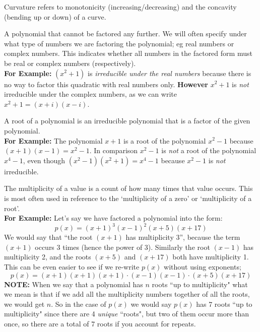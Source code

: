 \documentclass{ximera}
\begin{document}
\begin{definition}[Curvature]
    Curvature refers to monotonicity (increasing/decreasing) and the concavity (bending up or down) of a curve.
\end{definition} 

\begin{definition}
    A polynomial that cannot be factored any further. We will often specify under what type of numbers we are factoring the polynomial; eg real numbers or complex numbers. This indicates whether all numbers in the factored form must be real or complex numbers (respectively).\\
    \textbf{For Example:} $(x^2+1)$ is \textit{irreducible under the real numbers} because there is no way to factor this quadratic with real numbers only. \textbf{However} $x^2+1$ is \textit{not} irreducible under the complex numbers, as we can write $x^2+1 = (x+i)(x-i)$.
\end{definition} 

\begin{definition}
    A root of a polynomial is an irreducible polynomial that is a factor of the given polynomial.\\
    \textbf{For Example:} The polynomial $x + 1$ is a root of the polynomial $x^2 - 1$ because $(x+1)(x-1) = x^2 -1$. In comparison $x^2-1$ is \textit{not} a root of the polynomial $x^4-1$, even though $(x^2-1)(x^2+1) = x^4-1$ because $x^2-1$ is \textit{not} irreducible.
\end{definition}

\begin{definition}
    The multiplicity of a value is a count of how many times that value occurs. This is most often used in reference to the `multiplicity of a zero' or `multiplicity of a root'. \\
    \textbf{For Example:} Let's say we have factored a polynomial into the form:
    \[
        p(x) = (x+1)^3(x-1)^2(x+5)(x+17)
    \]
    We would say that ``the root $(x+1)$ has multiplicity 3'', because the term $(x+1)$ occurs 3 times (hence the power of 3). Similarly the root $(x-1)$ has multiplicity 2, and the roots $(x+5)$ and $(x+17)$ both have multiplicity 1. This can be even easier to see if we re-write $p(x)$ without using exponents;
    \[
        p(x) = (x+1)(x+1)(x+1)\cdot(x-1)(x-1)\cdot(x+5)(x+17)
    \]
    \textbf{NOTE:} When we say that a polynomial has $n$ roots ``up to multiplicity" what we mean is that if we add all the multiplicity numbers together of all the roots, we would get $n$. So in the case of $p(x)$ we would say $p(x)$ has 7 roots ``up to multiplicity" since there are 4 \textit{unique} ``roots", but two of them occur more than once, so there are a total of 7 roots if you account for repeats.
\end{definition}
\end{document}
